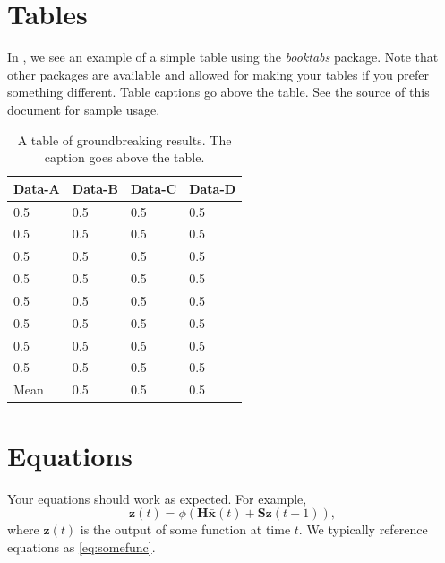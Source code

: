 \documentclass[master]{thesis}
\begin{document}
\section{Tables}

In , we see an example of a simple table using the \textit{booktabs} package.  Note that other packages are available and allowed for making your tables if you prefer something different.  Table captions go above the table.  See the source of this document for sample usage.

\begin{table}[hp]
    \caption[Sample table.]{A table of groundbreaking results.  The caption goes above the table.}
    \label{table:sample}

    \begin{center}
        \begin{tabular}{@{}*{4}{l}} %
            \toprule %
            Data-A  & Data-B    & Data-C    & Data-D \\
            \midrule %
            0.5     & 0.5       & 0.5       & 0.5   \\
            0.5     & 0.5       & 0.5       & 0.5   \\
            0.5     & 0.5       & 0.5       & 0.5   \\
            0.5     & 0.5       & 0.5       & 0.5   \\
            0.5     & 0.5       & 0.5       & 0.5   \\
            0.5     & 0.5       & 0.5       & 0.5   \\
            0.5     & 0.5       & 0.5       & 0.5   \\
            0.5     & 0.5       & 0.5       & 0.5   \\
            \midrule
            Mean    & 0.5       & 0.5       & 0.5   \\
            \bottomrule %
        \end{tabular}
    \end{center}
\end{table}

\section{Equations}

Your equations should work as expected.  For example,
\begin{equation}
    \mathbf{z}(t) = \phi(\mathbf{H} \bar{\mathbf{x}}(t) + \mathbf{S} \mathbf{z}(t-1)),
    \label{eq:somefunc}
\end{equation}
where $\mathbf{z}(t)$ is the output of some function at time $t$.  We typically reference equations as \eqref{eq:somefunc}.
\end{document}
